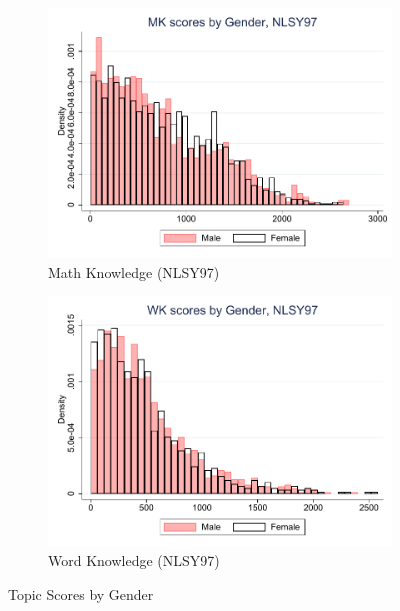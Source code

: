 \documentclass[onehalfspacing,11pt]{article}
\begin{document}
\begin{figure}
\begin{subfigure}{0.49\textwidth}
		\end{subfigure}
		\begin{subfigure}{0.49\textwidth}
			\includegraphics[width=\linewidth]{NLSY97_MK_gender.pdf}
			\caption{Math Knowledge (NLSY97)} \label{fig:nlsy97math}
		\end{subfigure}
		\hspace*{\fill} %
		\begin{subfigure}{0.49\textwidth}
			\includegraphics[width=\linewidth]{NLSY97_WK_gender.pdf}
			\caption{Word Knowledge (NLSY97)} \label{fig:nlsy97wprd}
		\end{subfigure}
		
		\caption{Topic Scores by Gender}
		\label{fig:nlsy_by_gender}
	\end{figure}
	
\end{document}
